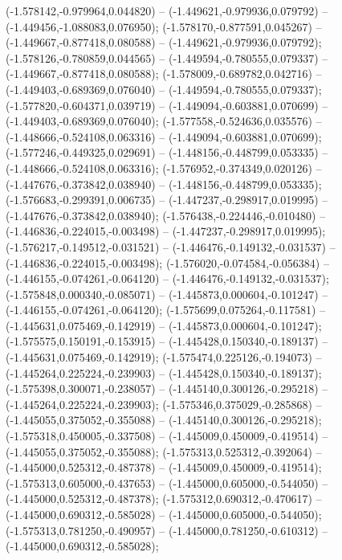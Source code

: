  (-1.578142,-0.979964,0.044820) -- (-1.449621,-0.979936,0.079792) -- (-1.449456,-1.088083,0.076950);
 (-1.578170,-0.877591,0.045267) -- (-1.449667,-0.877418,0.080588) -- (-1.449621,-0.979936,0.079792);
 (-1.578126,-0.780859,0.044565) -- (-1.449594,-0.780555,0.079337) -- (-1.449667,-0.877418,0.080588);
 (-1.578009,-0.689782,0.042716) -- (-1.449403,-0.689369,0.076040) -- (-1.449594,-0.780555,0.079337);
 (-1.577820,-0.604371,0.039719) -- (-1.449094,-0.603881,0.070699) -- (-1.449403,-0.689369,0.076040);
 (-1.577558,-0.524636,0.035576) -- (-1.448666,-0.524108,0.063316) -- (-1.449094,-0.603881,0.070699);
 (-1.577246,-0.449325,0.029691) -- (-1.448156,-0.448799,0.053335) -- (-1.448666,-0.524108,0.063316);
 (-1.576952,-0.374349,0.020126) -- (-1.447676,-0.373842,0.038940) -- (-1.448156,-0.448799,0.053335);
 (-1.576683,-0.299391,0.006735) -- (-1.447237,-0.298917,0.019995) -- (-1.447676,-0.373842,0.038940);
 (-1.576438,-0.224446,-0.010480) -- (-1.446836,-0.224015,-0.003498) -- (-1.447237,-0.298917,0.019995);
 (-1.576217,-0.149512,-0.031521) -- (-1.446476,-0.149132,-0.031537) -- (-1.446836,-0.224015,-0.003498);
 (-1.576020,-0.074584,-0.056384) -- (-1.446155,-0.074261,-0.064120) -- (-1.446476,-0.149132,-0.031537);
 (-1.575848,0.000340,-0.085071) -- (-1.445873,0.000604,-0.101247) -- (-1.446155,-0.074261,-0.064120);
 (-1.575699,0.075264,-0.117581) -- (-1.445631,0.075469,-0.142919) -- (-1.445873,0.000604,-0.101247);
 (-1.575575,0.150191,-0.153915) -- (-1.445428,0.150340,-0.189137) -- (-1.445631,0.075469,-0.142919);
 (-1.575474,0.225126,-0.194073) -- (-1.445264,0.225224,-0.239903) -- (-1.445428,0.150340,-0.189137);
 (-1.575398,0.300071,-0.238057) -- (-1.445140,0.300126,-0.295218) -- (-1.445264,0.225224,-0.239903);
 (-1.575346,0.375029,-0.285868) -- (-1.445055,0.375052,-0.355088) -- (-1.445140,0.300126,-0.295218);
 (-1.575318,0.450005,-0.337508) -- (-1.445009,0.450009,-0.419514) -- (-1.445055,0.375052,-0.355088);
 (-1.575313,0.525312,-0.392064) -- (-1.445000,0.525312,-0.487378) -- (-1.445009,0.450009,-0.419514);
 (-1.575313,0.605000,-0.437653) -- (-1.445000,0.605000,-0.544050) -- (-1.445000,0.525312,-0.487378);
 (-1.575312,0.690312,-0.470617) -- (-1.445000,0.690312,-0.585028) -- (-1.445000,0.605000,-0.544050);
 (-1.575313,0.781250,-0.490957) -- (-1.445000,0.781250,-0.610312) -- (-1.445000,0.690312,-0.585028);
